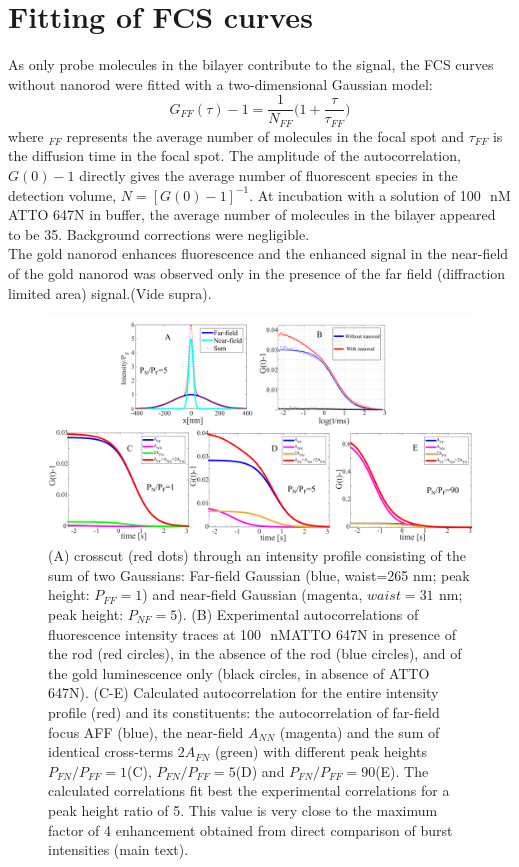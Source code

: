 \documentclass[11pt,a4paper,onecolumn]{article}
\newcommand{\nm}{\ensuremath{\,\textrm{nm}}}
\newcommand{\nM}{\ensuremath{\,\textrm{nM}}}
\begin{document}
\section{Fitting of FCS curves}
As only probe molecules in the bilayer contribute to the signal, the FCS curves without nanorod
were fitted with a two-dimensional Gaussian model:
\begin{equation}
	G_{FF}(\tau)-1 = \frac{1}{N_{FF}}\Bigg(1+\frac{\tau}{\tau_{FF}}\Bigg)
	\label{eq:2Dgauss}
\end{equation}
where $_{FF}$ represents the average number of molecules in the focal spot and $\tau_{FF}$ is the diffusion time in the 
focal spot. The amplitude of the autocorrelation, $G(0)-1$ directly gives the average number of fluorescent species in 
the detection volume, $N=[G(0)-1]^{-1}$. At incubation with a solution of 100~\nM ATTO 647N in buffer, the average 
number of molecules in the bilayer appeared to be 35. Background corrections were negligible.\\
The gold nanorod enhances fluorescence and the enhanced signal in the near-field of the gold nanorod was observed only 
in the presence of the far field (diffraction limited area) signal.(Vide supra).\\
\begin{figure}[ht]
  \centering
  \includegraphics[width=\textwidth]{calc_enhc_corr.png}
  \makeatletter
  \renewcommand{\fnum@figure}{\figurename~S\thefigure}
  \makeatother{}
  \caption{(A) crosscut (red dots) through an intensity profile consisting of the sum of two Gaussians: Far-field 
  Gaussian (blue, waist=265 nm; peak height: $P_{FF}=1$) and near-field Gaussian (magenta, $waist=31~\nm$; peak 
  height: $P_{NF}=5$). (B) Experimental autocorrelations of fluorescence intensity traces at 100~\nM ATTO 647N in 
  presence of the rod (red circles), in the absence of the rod (blue circles), and of the gold luminescence only 
  (black circles, in absence of ATTO 647N). (C-E) Calculated autocorrelation for the entire intensity profile (red) 
  and its constituents: the autocorrelation of far-field focus AFF (blue), the near-field $A_{NN}$ (magenta) and the 
  sum of identical cross-terms $2A_{FN}$ (green) with different peak heights
  $P_{FN}/P_{FF}=1$(C), $P_{FN}/P_{FF}=5$(D) and $P_{FN}/P_{FF}=90$(E). The calculated correlations fit best the 
  experimental correlations for a peak height ratio of 5. This value is very close to the maximum factor of 4 
  enhancement obtained from direct comparison of burst intensities (main text).}
  \label{SIfig:calc_enhc_corr}
\end{figure}
\end{document}
